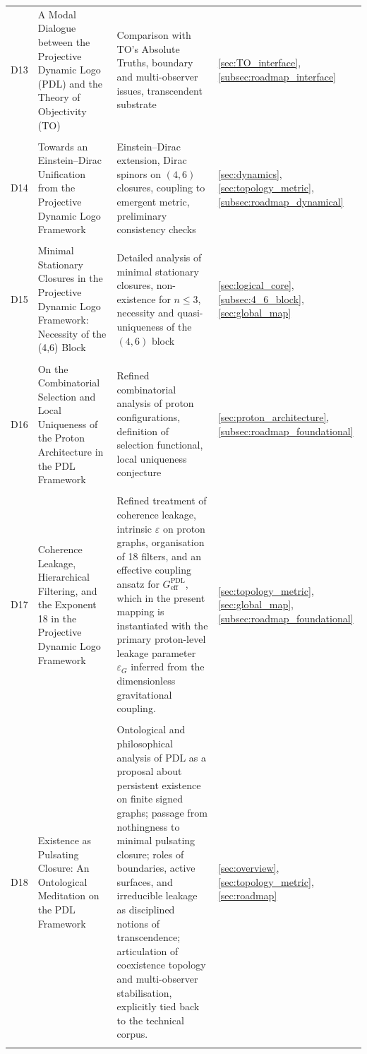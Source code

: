 \documentclass[11pt,a4paper]{article}
\newcommand{\PDL}{\mathrm{PDL}}
\begin{document}
\begin{longtable}{@{}p{0.9cm}L{5cm}L{6.5cm}L{2.4cm}@{}}
  D13 &
  A Modal Dialogue between the Projective Dynamic Logo (PDL) and the Theory of Objectivity (TO) &
  Comparison with TO's Absolute Truths, boundary and multi-observer issues, transcendent substrate &
  \ref{sec:TO_interface}, \ref{subsec:roadmap_interface} \\\\[0.4em]

  D14 &
  Towards an Einstein--Dirac Unification from the Projective Dynamic Logo Framework &
  Einstein–Dirac extension, Dirac spinors on $(4,6)$ closures, coupling to emergent metric, preliminary consistency checks &
  \ref{sec:dynamics}, \ref{sec:topology_metric}, \ref{subsec:roadmap_dynamical} \\\\[0.4em]

  D15 &
  Minimal Stationary Closures in the Projective Dynamic Logo Framework: Necessity of the (4,6) Block &
  Detailed analysis of minimal stationary closures, non-existence for $n \leq 3$, necessity and quasi-uniqueness of the $(4,6)$ block &
  \ref{sec:logical_core}, \ref{subsec:4_6_block}, \ref{sec:global_map} \\\\[0.4em]

  D16 &
  On the Combinatorial Selection and Local Uniqueness of the Proton Architecture in the PDL Framework &
  Refined combinatorial analysis of proton configurations, definition of selection functional, local uniqueness conjecture &
  \ref{sec:proton_architecture}, \ref{subsec:roadmap_foundational} \\\\[0.4em]

  D17 &
  Coherence Leakage, Hierarchical Filtering, and the Exponent 18 in the Projective Dynamic Logo Framework &
  Refined treatment of coherence leakage, intrinsic $\varepsilon$ on proton graphs, organisation of 18 filters, and an effective coupling ansatz for $G_{\mathrm{eff}}^{\PDL}$, which in the present mapping is instantiated with the primary proton-level leakage parameter $\varepsilon_G$ inferred from the dimensionless gravitational coupling.
 &
  \ref{sec:topology_metric}, \ref{sec:global_map}, \ref{subsec:roadmap_foundational} \\\\[0.4em] 

  D18 & 
  Existence as Pulsating Closure: An Ontological Meditation on the PDL Framework & Ontological and philosophical analysis of PDL as a proposal about persistent existence on finite signed graphs; passage from nothingness to minimal pulsating closure; roles of boundaries, active surfaces, and irreducible leakage as disciplined notions of transcendence; articulation of coexistence topology and multi-observer stabilisation, explicitly tied back to the technical corpus. & 
  \ref{sec:overview}, \ref{sec:topology_metric}, \ref{sec:roadmap} \\\\[0.4em] 
  

\end{longtable}
\end{document}
